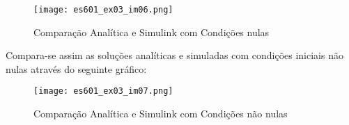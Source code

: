\documentclass{article}
\begin{document}
\begin{resolution}
                    \begin{figure}[H]
                        \centering
                        \texttt{[image: es601\_ex03\_im06.png]}
                        \caption{Comparação Analítica e Simulink com Condições nulas}
                    \end{figure}
                Compara-se assim as soluções analíticas e simuladas com condições iniciais não nulas através do seguinte gráfico:
                    \begin{figure}[H]
                        \centering
                        \texttt{[image: es601\_ex03\_im07.png]}
                        \caption{Comparação Analítica e Simulink com Condições não nulas}
                    \end{figure}
            \end{resolution}
\newpage
\end{document}

